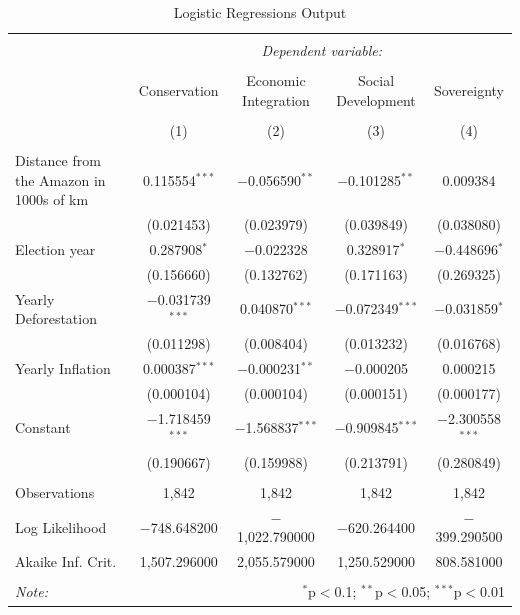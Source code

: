 \documentclass[
  12pt,
]{article}
\begin{document}
\begin{landscape}


\begin{table}[!htbp] \centering 
  \caption{Logistic Regressions Output} 
  \label{} 
\begin{tabular}{@{\extracolsep{5pt}}lcccc} 
\\[-1.8ex]\hline 
\hline \\[-1.8ex] 
 & \multicolumn{4}{c}{\textit{Dependent variable:}} \\ 
\cline{2-5} 
\\[-1.8ex] & Conservation & Economic Integration & Social Development & Sovereignty \\ 
\\[-1.8ex] & (1) & (2) & (3) & (4)\\ 
\hline \\[-1.8ex] 
 Distance from the Amazon in 1000s of km & 0.115554$^{***}$ & $-$0.056590$^{**}$ & $-$0.101285$^{**}$ & 0.009384 \\ 
  & (0.021453) & (0.023979) & (0.039849) & (0.038080) \\ 
  Election year & 0.287908$^{*}$ & $-$0.022328 & 0.328917$^{*}$ & $-$0.448696$^{*}$ \\ 
  & (0.156660) & (0.132762) & (0.171163) & (0.269325) \\ 
  Yearly Deforestation & $-$0.031739$^{***}$ & 0.040870$^{***}$ & $-$0.072349$^{***}$ & $-$0.031859$^{*}$ \\ 
  & (0.011298) & (0.008404) & (0.013232) & (0.016768) \\ 
  Yearly   Inflation & 0.000387$^{***}$ & $-$0.000231$^{**}$ & $-$0.000205 & 0.000215 \\ 
  & (0.000104) & (0.000104) & (0.000151) & (0.000177) \\ 
  Constant & $-$1.718459$^{***}$ & $-$1.568837$^{***}$ & $-$0.909845$^{***}$ & $-$2.300558$^{***}$ \\ 
  & (0.190667) & (0.159988) & (0.213791) & (0.280849) \\ 
 \hline \\[-1.8ex] 
Observations & 1,842 & 1,842 & 1,842 & 1,842 \\ 
Log Likelihood & $-$748.648200 & $-$1,022.790000 & $-$620.264400 & $-$399.290500 \\ 
Akaike Inf. Crit. & 1,507.296000 & 2,055.579000 & 1,250.529000 & 808.581000 \\ 
\hline 
\hline \\[-1.8ex] 
\textit{Note:}  & \multicolumn{4}{r}{$^{*}$p$<$0.1; $^{**}$p$<$0.05; $^{***}$p$<$0.01} \\ 
\end{tabular} 
\end{table} 

\end{landscape}
\end{document}
